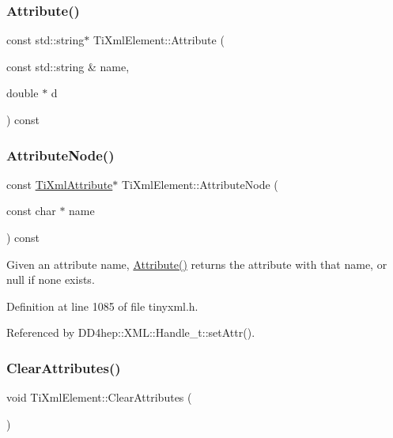 \subsubsection{\texorpdfstring{Attribute()}{Attribute()}\hspace{0.1cm}{\footnotesize\ttfamily [6/6]}}
{\footnotesize\ttfamily const std\+::string$\ast$ Ti\+Xml\+Element\+::\+Attribute (\begin{DoxyParamCaption}\item[{const std\+::string \&}]{name,  }\item[{double $\ast$}]{d }\end{DoxyParamCaption}) const}

\hypertarget{class_ti_xml_element_a6f8673586bc8063e838b89cf9dc6891f}{}\label{class_ti_xml_element_a6f8673586bc8063e838b89cf9dc6891f} 
\subsubsection{\texorpdfstring{Attribute\+Node()}{AttributeNode()}}
{\footnotesize\ttfamily const \hyperlink{class_ti_xml_attribute}{Ti\+Xml\+Attribute}$\ast$ Ti\+Xml\+Element\+::\+Attribute\+Node (\begin{DoxyParamCaption}\item[{const char $\ast$}]{name }\end{DoxyParamCaption}) const\hspace{0.3cm}{\ttfamily [inline]}}

Given an attribute name, \hyperlink{class_ti_xml_element_a6042f518748f475a7ac4b4e0b509eb05}{Attribute()} returns the attribute with that name, or null if none exists. 

Definition at line 1085 of file tinyxml.\+h.



Referenced by D\+D4hep\+::\+X\+M\+L\+::\+Handle\+\_\+t\+::set\+Attr().

\hypertarget{class_ti_xml_element_a11ad3e12a953d9b9aaae7625bf872a7a}{}\label{class_ti_xml_element_a11ad3e12a953d9b9aaae7625bf872a7a} 
\subsubsection{\texorpdfstring{Clear\+Attributes()}{ClearAttributes()}}
{\footnotesize\ttfamily void Ti\+Xml\+Element\+::\+Clear\+Attributes (\begin{DoxyParamCaption}{ }\end{DoxyParamCaption})}


